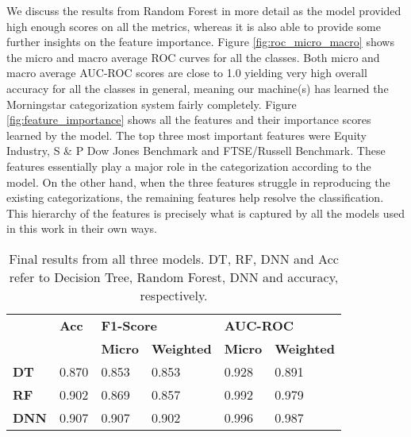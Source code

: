 \documentclass[sigconf]{acmart}
\begin{document}
We discuss the results from Random Forest in more detail as the model provided high enough scores on all the metrics, whereas it is also able to provide some further insights on the feature importance. Figure \ref{fig:roc_micro_macro} shows the micro and macro average ROC curves for all the classes. Both micro and macro average AUC-ROC scores are close to 1.0 yielding very high overall accuracy for all the classes in general, meaning our machine(s) has learned the Morningstar categorization system fairly completely. Figure \ref{fig:feature_importance} shows all the features and their importance scores learned by the model. The top three most important features were Equity Industry, S \& P Dow Jones Benchmark and FTSE/Russell Benchmark. These features essentially play a major role in the categorization according to the model. On the other hand, when the three features struggle in reproducing the existing categorizations, the remaining features help resolve the classification. This hierarchy of the features is precisely what is captured by all the models used in this work in their own ways.
\begin{table}[h!]
\centering
\begin{tabular}{l|l|l|l|ll}
 & \textbf{Acc} & \multicolumn{2}{l|}{\textbf{F1-Score}} & \multicolumn{2}{l}{\textbf{AUC-ROC}} \\ \cline{3-6} 
 & \textbf{} & \textbf{Micro} & \textbf{Weighted} & \multicolumn{1}{l|}{\textbf{Micro}} & \textbf{Weighted} \\ \hline
\textbf{DT} & 0.870 & 0.853 & 0.853 & \multicolumn{1}{l|}{0.928} & 0.891 \\
\textbf{RF} & 0.902 & 0.869 & 0.857 & \multicolumn{1}{l|}{0.992} & 0.979 \\
\textbf{DNN} & 0.907 & 0.907 & 0.902  & \multicolumn{1}{l|}{0.996} & 0.987
\end{tabular}
\caption{Final results from all three models. DT, RF, DNN and Acc refer to Decision Tree, Random Forest, DNN and accuracy, respectively.}
\label{table:results}
\end{table}
\end{document}
